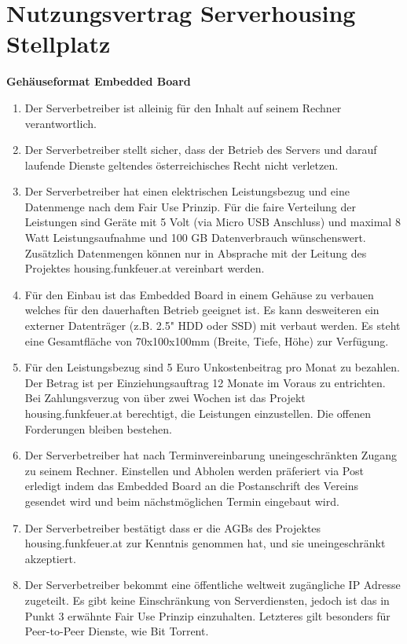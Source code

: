 \documentclass[parskip=half]{scrreprt}
\begin{document}
\small
\chapter*{Nutzungsvertrag Serverhousing Stellplatz}
\vspace{-0.8cm}
\textbf{Gehäuseformat Embedded Board\\}


\begin{contract}
\begin{enumerate}
\item Der Serverbetreiber ist alleinig für den Inhalt auf seinem Rechner verantwortlich.
\item Der Serverbetreiber stellt sicher, dass der Betrieb des Servers und darauf laufende Dienste geltendes österreichisches Recht nicht verletzen.
\item Der Serverbetreiber hat einen elektrischen Leistungsbezug und eine Datenmenge nach dem Fair Use Prinzip. Für die faire Verteilung der Leistungen sind Geräte mit 5 Volt (via Micro USB Anschluss) und maximal 8 Watt Leistungsaufnahme und 100 GB Datenverbrauch wünschenswert. Zusätzlich Datenmengen können nur in Absprache mit der Leitung des Projektes housing.funkfeuer.at vereinbart werden.
\item Für den Einbau ist das Embedded Board in einem Gehäuse zu verbauen welches für den dauerhaften Betrieb geeignet ist. Es kann desweiteren ein externer Datenträger (z.B. 2.5" HDD oder SSD) mit verbaut werden. Es steht eine Gesamtfläche von 70x100x100mm (Breite, Tiefe, Höhe) zur Verfügung.
\item Für den Leistungsbezug sind 5 Euro Unkostenbeitrag pro Monat zu bezahlen. Der Betrag ist per Einziehungsauftrag 12 Monate im Voraus zu entrichten. Bei Zahlungsverzug von über zwei Wochen ist das Projekt housing.funkfeuer.at berechtigt, die Leistungen einzustellen. Die offenen Forderungen bleiben bestehen.
\item Der Serverbetreiber hat nach Terminvereinbarung uneingeschränkten Zugang zu seinem Rechner. Einstellen und Abholen werden präferiert via Post erledigt indem das Embedded Board an die Postanschrift des Vereins gesendet wird und beim nächstmöglichen Termin eingebaut wird.
\item Der Serverbetreiber bestätigt dass er die AGBs des Projektes housing.funkfeuer.at zur Kenntnis genommen hat, und sie uneingeschränkt akzeptiert.
\item Der Serverbetreiber bekommt eine öffentliche weltweit zugängliche IP Adresse zugeteilt. Es gibt keine Einschränkung von Serverdiensten, jedoch ist das in Punkt 3 erwähnte Fair Use Prinzip einzuhalten. Letzteres gilt besonders für Peer-to-Peer Dienste, wie Bit Torrent.

\end{enumerate}
\end{contract}
\end{document}
